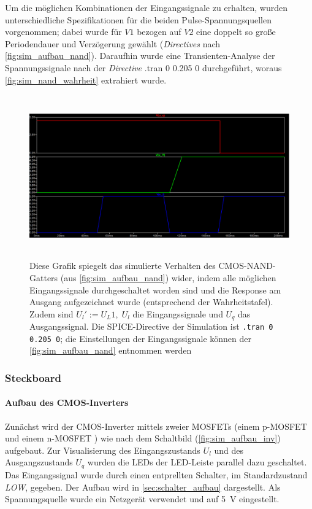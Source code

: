 \documentclass[12pt,english,ngerman]{scrartcl}
\begin{document}
Um die möglichen Kombinationen der Eingangssignale zu erhalten, wurden
unterschiedliche Spezifikationen für die beiden Pulse-Spannungsquellen
vorgenommen; dabei wurde für $V1$ bezogen auf $V2$ eine doppelt so große
Periodendauer und Verzögerung gewählt (\textit{Directives} nach \autoref{fig:sim_aufbau_nand}).
Daraufhin wurde eine Transienten-Analyse der Spannungssignale nach der
\textit{Directive} {.tran 0 0.205 0} durchgeführt, woraus \autoref{fig:sim_nand_wahrheit} extrahiert wurde.
\begin{figure}[H]
  \centering
    \includegraphics[width=\linewidth, height=7cm]{./simdaten_lab/cmos/nand/nand_funktion.png}
  \caption{Diese Grafik spiegelt das simulierte Verhalten des CMOS-NAND-Gatters (aus
    \autoref{fig:sim_aufbau_nand}) wider, indem alle möglichen Eingangssignale
    durchgeschaltet worden sind und die Response am Ausgang aufgezeichnet
    wurde (entsprechend der Wahrheitstafel). Zudem sind
    $U_l':=U_L1,\; U_l$ die Eingangssignale und $U_q$ das Ausgangssignal. Die
    SPICE-Directive der Simulation ist \texttt{.tran 0 0.205 0}; die
  Einstellungen der Eingangssignale können der \autoref{fig:sim_aufbau_nand}
  entnommen werden}
  \label{fig:sim_nand_wahrheit}
\end{figure}

\subsubsection{Steckboard}
\paragraph{Aufbau des CMOS-Inverters}\label{sec:mess_cmos}
Zunächst wird der CMOS-Inverter mittels zweier MOSFETs (einem p-MOSFET \cite{ZVP2106A} und
einem n-MOSFET \cite{ZVN2106A}) wie nach dem Schaltbild (\autoref{fig:sim_aufbau_inv})
aufgebaut. Zur Visualisierung des Eingangszustands $U_l$ und des
Ausgangszustands $U_q$ wurden die LEDs der LED-Leiste parallel dazu geschaltet. Das
Eingangssignal wurde durch einen entprellten Schalter, im Standardzustand
\textit{LOW}, gegeben. Der Aufbau wird in \autoref{sec:schalter_aufbau} dargestellt. Als
Spannungsquelle wurde ein Netzgerät verwendet und auf \SI{5}{\volt}
eingestellt. 
\end{document}
